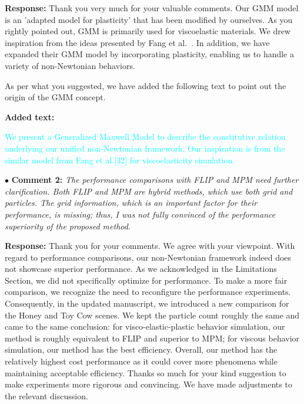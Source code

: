 \documentclass[12pt,a4paper]{article}
\newcommand{\revised}[1]{\textcolor{cyan}{#1}}
\begin{document}
\vspace{0.2cm}
\textbf{Response:}
Thank you very much for your valuable comments.
Our GMM model is an 'adapted model for plasticity' that has been modified by ourselves. As you rightly pointed out, GMM is primarily used for viscoelastic materials. We drew inspiration from the ideas presented by Fang et al.~\cite{Fang2019-sillyRubber}. In addition, we have expanded their GMM model by incorporating plasticity, enabling us to handle a variety of non-Newtonian behaviors.

As per what you suggested, we have added the following text to point out the origin of the GMM concept.

\vspace{0.2cm}
\textbf{Added text:}

\revised{We present a Generalized Maxwell Model to describe the constitutive relation underlying our unified non-Newtonian framework. Our inspiration is from the similar model from Fang et al.[32] for viscoelasticity simulation.}




\vspace{0.4cm}
\noindent$\bullet$ \enspace \textbf{Comment 2:}
\textit{The performance comparisons with FLIP and MPM need further clarification. Both FLIP and MPM are hybrid methods, which use both grid and particles. The grid information, which is an important factor for their performance, is missing; thus, I was not fully convinced of the performance superiority of the proposed method. }


\vspace{0.2cm}
\textbf{Response:}
Thank you for your comments. We agree with your viewpoint. With regard to performance comparisons, our non-Newtonian framework indeed does not showcase superior performance. As we acknowledged in the Limitations Section, we did not specifically optimize for performance. To make a more fair comparison, we recognize the need to reconfigure the performance experiments. Consequently, in the updated manuscript, we introduced a new comparison for the Honey and Toy Cow scenes. We kept the particle count roughly the same and came to the same conclusion: for visco-elastic-plastic behavior simulation, our method is roughly equivalent to FLIP and superior to MPM; for viscous behavior simulation, our method has the best efficiency. Overall, our method has the relatively highest cost performance as it could cover more phenomena while maintaining acceptable efficiency.
Thanks so much for your kind suggestion to make experiments more rigorous and convincing. We have made adjustments to the relevant discussion.
\end{document}
